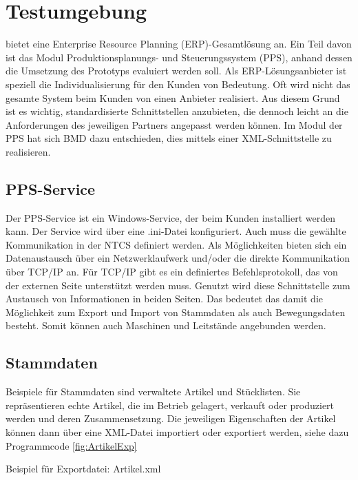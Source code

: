 \chapter{Testumgebung}
\label{cha:Testumgebung}

\BMD bietet eine Enterprise Resource Planning (ERP)-Gesamtlösung an. Ein Teil davon ist das Modul Produktionsplanungs- und Steuerungssystem (PPS), anhand dessen die Umsetzung des Prototyps evaluiert werden soll.
Als ERP-Lösungs\-anbieter ist speziell die Individualisierung für den Kunden von Bedeutung. Oft wird nicht das gesamte System beim Kunden von einen Anbieter realisiert. Aus diesem Grund ist es wichtig, standardisierte Schnittstellen anzubieten, die dennoch leicht an die Anforderungen des jeweiligen Partners angepasst werden können. Im Modul der PPS hat sich BMD dazu entschieden, dies mittels einer XML-Schnittstelle zu realisieren.



\section{PPS-Service}
Der PPS-Service  ist ein Windows-Service, der beim Kunden installiert werden kann. Der Service wird über eine .ini-Datei konfiguriert. Auch muss die gewählte Kommunikation in der NTCS definiert werden. Als Möglichkeiten bieten sich ein Datenaustausch über ein Netzwerklaufwerk und/oder die direkte Kommunikation über TCP/IP an. Für TCP/IP gibt es ein definiertes Befehlsprotokoll, das von der externen Seite unterstützt werden muss.
Genutzt wird diese Schnittstelle zum Austausch von Informationen in beiden Seiten. Das bedeutet das damit die Möglichkeit zum Export und Import von Stammdaten als auch Bewegungsdaten besteht. Somit können auch Maschinen und Leitstände angebunden werden. 

\section{Stammdaten}
Beispiele für Stammdaten sind verwaltete Artikel und Stücklisten. Sie repräsentieren echte Artikel, die im Betrieb gelagert, verkauft oder produziert werden und deren Zusammensetzung. Die jeweiligen Eigenschaften der Artikel können dann über eine XML-Datei importiert oder exportiert werden, siehe dazu Programmcode \ref{fig:ArtikelExp}


\begin{program}
\centering
{}
    
\caption{Beispiel für Exportdatei: Artikel.xml
}
\label{fig:ArtikelExp}
\end{program}


